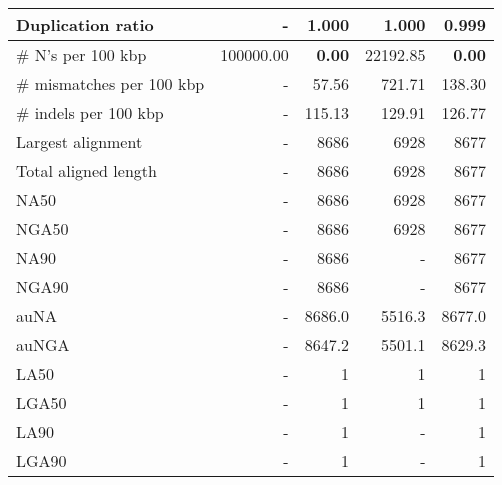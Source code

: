 \documentclass[12pt,a4paper]{article}
\begin{document}
\begin{table}[ht]
\begin{center}
\begin{tabular}{|l*{4}{|r}|}
Duplication ratio & - & 1.000 & 1.000 & 0.999 \\ \hline
\# N's per 100 kbp & 100000.00 & {\bf 0.00} & 22192.85 & {\bf 0.00} \\ \hline
\# mismatches per 100 kbp & - & 57.56 & 721.71 & 138.30 \\ \hline
\# indels per 100 kbp & - & 115.13 & 129.91 & 126.77 \\ \hline
Largest alignment & - & 8686 & 6928 & 8677 \\ \hline
Total aligned length & - & 8686 & 6928 & 8677 \\ \hline
NA50 & - & 8686 & 6928 & 8677 \\ \hline
NGA50 & - & 8686 & 6928 & 8677 \\ \hline
NA90 & - & 8686 & - & 8677 \\ \hline
NGA90 & - & 8686 & - & 8677 \\ \hline
auNA & - & 8686.0 & 5516.3 & 8677.0 \\ \hline
auNGA & - & 8647.2 & 5501.1 & 8629.3 \\ \hline
LA50 & - & 1 & 1 & 1 \\ \hline
LGA50 & - & 1 & 1 & 1 \\ \hline
LA90 & - & 1 & - & 1 \\ \hline
LGA90 & - & 1 & - & 1 \\ \hline
\end{tabular}
\end{center}
\end{table}
\end{document}
